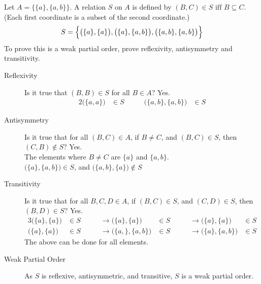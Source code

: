 \documentclass[../notes.tex]{subfiles}
\begin{document}
				\begin{example}
					Let $A = \bigl\{\{a\}, \{a, b\}\bigr\}$. A relation $S$ on $A$ is defined by $(B, C) \in S \text{ iff } B \subseteq C$. (Each first coordinate is a subset of the second coordinate.)
					\begin{align*}
						S = \Bigl\{\bigl(\{a\}, \{a\}\bigr), \bigl(\{a\}, \{a, b\}\bigr), \bigl(\{a, b\}, \{a, b\}\bigr)\Bigr\}
					\end{align*}
					To prove this is a weak partial order, prove reflexivity, antisymmetry and transitivity.
					\begin{description}
						\item[Reflexivity] Is it true that $(B, B) \in S$ for all $B \in A$? Yes.
							\begin{alignat*}{2}
								\bigl(\{a, a\}\bigr) &\in S \qquad & \bigl(\{a, b\}, \{a, b\}\bigr) &\in S
							\end{alignat*}
						\item[Antisymmetry] Is it true that for all $(B, C) \in A$, if $B \neq C$, and $(B, C) \in S$, then $(C, B) \notin S$? Yes.\\
							The elements where $B \neq C$ are $\{a\}$ and $\{a, b\}$.\\
							$\bigl(\{a\}, \{a, b\}\bigr) \in S$, and $\bigl(\{a, b\}, \{a\}\bigr) \notin S$
						\item[Transitivity] Is it true that for all $B, C, D \in A$, if $(B, C) \in S$, and $(C, D) \in S$, then $(B, D) \in S$? Yes.
							\begin{alignat*}{3}
								\bigl(\{a\}, \{a\}\bigr) &\in S \qquad &\rightarrow \bigl(\{a\}, \{a\}\bigr) &\in S \qquad &\rightarrow \bigl(\{a\}, \{a\}\bigr) &\in S\\
								\bigl(\{a\}, \{a\}\bigr) &\in S \qquad &\rightarrow \bigl(\{a,\}, \{a, b\}\bigr) &\in S \qquad &\rightarrow \bigl(\{a\}, \{a, b\}\bigr) &\in S
							\end{alignat*}
							The above can be done for all elements.
						\item[Weak Partial Order] As $S$ is reflexive, antisymmetric, and transitive, $S$ is a weak partial order.
					\end{description}
				\end{example}
\end{document}
